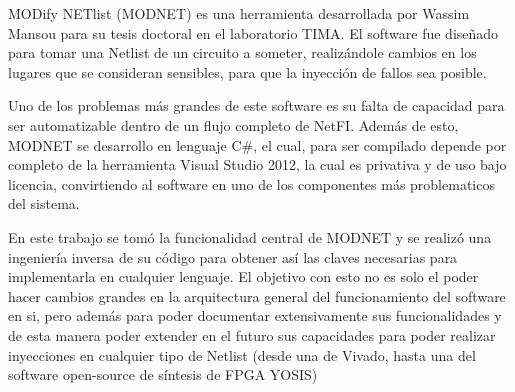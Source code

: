 MODify NETlist (MODNET) es una herramienta desarrollada por Wassim Mansou para su tesis doctoral en el laboratorio TIMA. El software fue diseñado para tomar una Netlist de un circuito a  someter, realizándole cambios en los lugares que se consideran sensibles, para que la inyección de fallos sea posible. 

Uno de los problemas más grandes de este software es su falta de capacidad para ser automatizable dentro de un flujo completo de NetFI. Además de esto, MODNET se desarrollo en lenguaje C\#, el cual, para ser compilado depende por completo de la herramienta Visual Studio 2012, la cual es privativa y de uso bajo licencia, convirtiendo al software en uno de los componentes más problematicos del sistema.

En este trabajo se tomó la funcionalidad central de MODNET y se realizó una ingeniería inversa de su código para obtener así las claves necesarias para implementarla en cualquier lenguaje. El objetivo con esto no es solo el poder hacer cambios grandes en la arquitectura general del funcionamiento del software en si, pero además para poder documentar extensivamente sus funcionalidades y de esta manera poder extender en el futuro sus capacidades para poder realizar inyecciones en cualquier tipo de Netlist (desde una de Vivado, hasta una del software open-source de síntesis de FPGA YOSIS)